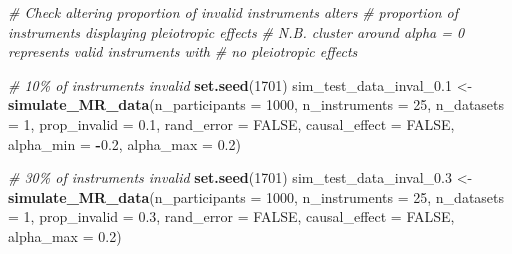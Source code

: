 \documentclass[
]{article}
\newenvironment{Shaded}{\begin{snugshade}}{\end{snugshade}}
\newcommand{\AttributeTok}[1]{\textcolor[rgb]{0.13,0.29,0.53}{#1}}
\newcommand{\CommentTok}[1]{\textcolor[rgb]{0.56,0.35,0.01}{\textit{#1}}}
\newcommand{\ConstantTok}[1]{\textcolor[rgb]{0.56,0.35,0.01}{#1}}
\newcommand{\DecValTok}[1]{\textcolor[rgb]{0.00,0.00,0.81}{#1}}
\newcommand{\FloatTok}[1]{\textcolor[rgb]{0.00,0.00,0.81}{#1}}
\newcommand{\FunctionTok}[1]{\textcolor[rgb]{0.13,0.29,0.53}{\textbf{#1}}}
\newcommand{\NormalTok}[1]{#1}
\newcommand{\OtherTok}[1]{\textcolor[rgb]{0.56,0.35,0.01}{#1}}
\newcommand{\SpecialCharTok}[1]{\textcolor[rgb]{0.81,0.36,0.00}{\textbf{#1}}}
\begin{document}
\begin{Shaded}
\begin{Highlighting}[]
\CommentTok{\# Check altering proportion of invalid instruments alters}
\CommentTok{\# proportion of instruments displaying pleiotropic effects}
\CommentTok{\# N.B. cluster around alpha = 0 represents valid instruments with}
\CommentTok{\# no pleiotropic effects}

\CommentTok{\# 10\% of instruments invalid}
 \FunctionTok{set.seed}\NormalTok{(}\DecValTok{1701}\NormalTok{)}
\NormalTok{ sim\_test\_data\_inval\_0}\FloatTok{.1} \OtherTok{\textless{}{-}} \FunctionTok{simulate\_MR\_data}\NormalTok{(}\AttributeTok{n\_participants =} \DecValTok{1000}\NormalTok{,}
                                             \AttributeTok{n\_instruments =} \DecValTok{25}\NormalTok{,}
                                             \AttributeTok{n\_datasets =} \DecValTok{1}\NormalTok{,}
                                             \AttributeTok{prop\_invalid =} \FloatTok{0.1}\NormalTok{,}
                                             \AttributeTok{rand\_error =} \ConstantTok{FALSE}\NormalTok{,}
                                             \AttributeTok{causal\_effect =} \ConstantTok{FALSE}\NormalTok{,}
                                             \AttributeTok{alpha\_min =} \SpecialCharTok{{-}}\FloatTok{0.2}\NormalTok{,}
                                             \AttributeTok{alpha\_max =} \FloatTok{0.2}\NormalTok{)}

\CommentTok{\# 30\% of instruments invalid}
 \FunctionTok{set.seed}\NormalTok{(}\DecValTok{1701}\NormalTok{)}
\NormalTok{ sim\_test\_data\_inval\_0}\FloatTok{.3} \OtherTok{\textless{}{-}} \FunctionTok{simulate\_MR\_data}\NormalTok{(}\AttributeTok{n\_participants =} \DecValTok{1000}\NormalTok{,}
                                             \AttributeTok{n\_instruments =} \DecValTok{25}\NormalTok{,}
                                             \AttributeTok{n\_datasets =} \DecValTok{1}\NormalTok{,}
                                             \AttributeTok{prop\_invalid =} \FloatTok{0.3}\NormalTok{,}
                                             \AttributeTok{rand\_error =} \ConstantTok{FALSE}\NormalTok{,}
                                             \AttributeTok{causal\_effect =} \ConstantTok{FALSE}\NormalTok{,}
                                             \AttributeTok{alpha\_max =} \FloatTok{0.2}\NormalTok{)}


\end{Highlighting}
\end{Shaded}
\end{document}
